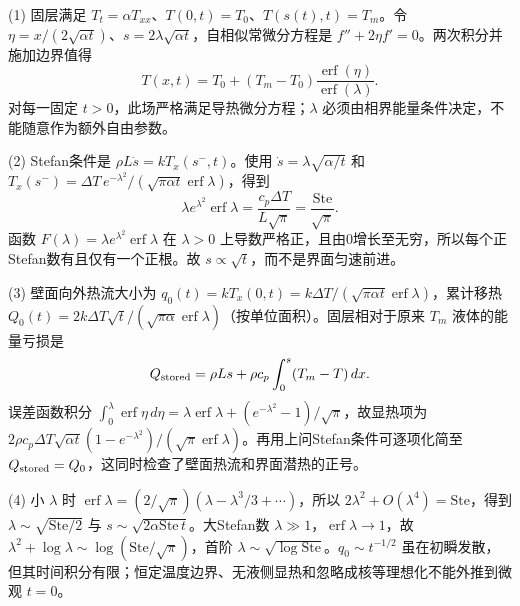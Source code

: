 (1) 固层满足 \(T_t=\alpha T_{xx}\)、\(T(0,t)=T_0\)、\(T(s(t),t)=T_m\)。令 \(\eta=x/(2\sqrt{\alpha t})\)、\(s=2\lambda\sqrt{\alpha t}\)，自相似常微分方程是 \(f''+2\eta f'=0\)。两次积分并施加边界值得
\[
\boxed{T(x,t)=T_0+(T_m-T_0)\frac{\operatorname{erf}(\eta)}{\operatorname{erf}(\lambda)}}.
\]
对每一固定 \(t>0\)，此场严格满足导热微分方程；\(\lambda\) 必须由相界能量条件决定，不能随意作为额外自由参数。

(2) Stefan条件是 \(\rho L\dot s=kT_x(s^-,t)\)。使用 \(\dot s=\lambda\sqrt{\alpha/t}\) 和
\(T_x(s^-)=\Delta T\,e^{-\lambda^2}/(\sqrt{\pi\alpha t}\operatorname{erf}\lambda)\)，得到
\[
\boxed{\lambda e^{\lambda^2}\operatorname{erf}\lambda=\frac{c_p\Delta T}{L\sqrt\pi}=\frac{\mathrm{Ste}}{\sqrt\pi}}.
\]
函数 \(F(\lambda)=\lambda e^{\lambda^2}\operatorname{erf}\lambda\) 在 \(\lambda>0\) 上导数严格正，且由0增长至无穷，所以每个正Stefan数有且仅有一个正根。故 \(s\propto\sqrt t\)，而不是界面匀速前进。

(3) 壁面向外热流大小为 \(q_0(t)=kT_x(0,t)=k\Delta T/(\sqrt{\pi\alpha t}\operatorname{erf}\lambda)\)，累计移热
\(Q_0(t)=2k\Delta T\sqrt t/(\sqrt{\pi\alpha}\operatorname{erf}\lambda)\)（按单位面积）。固层相对于原来 \(T_m\) 液体的能量亏损是
\[
Q_{\rm stored}=\rho Ls+\rho c_p\int_0^s(T_m-T)\,dx.
\]
误差函数积分 \(\int_0^\lambda\operatorname{erf}\eta\,d\eta=\lambda\operatorname{erf}\lambda+(e^{-\lambda^2}-1)/\sqrt\pi\)，故显热项为
\(2\rho c_p\Delta T\sqrt{\alpha t}(1-e^{-\lambda^2})/(\sqrt\pi\operatorname{erf}\lambda)\)。再用上问Stefan条件可逐项化简至 \(Q_{\rm stored}=Q_0\)，这同时检查了壁面热流和界面潜热的正号。

(4) 小 \(\lambda\) 时 \(\operatorname{erf}\lambda=(2/\sqrt\pi)(\lambda-\lambda^3/3+\cdots)\)，所以 \(2\lambda^2+O(\lambda^4)=\mathrm{Ste}\)，得到 \(\lambda\sim\sqrt{\mathrm{Ste}/2}\) 与 \(s\sim\sqrt{2\alpha\mathrm{Ste}\,t}\)。大Stefan数 \(\lambda\gg1\)，\(\operatorname{erf}\lambda\to1\)，故 \(\lambda^2+\log\lambda\sim\log(\mathrm{Ste}/\sqrt\pi)\)，首阶 \(\lambda\sim\sqrt{\log\mathrm{Ste}}\)。\(q_0\sim t^{-1/2}\) 虽在初瞬发散，但其时间积分有限；恒定温度边界、无液侧显热和忽略成核等理想化不能外推到微观 \(t=0\)。
